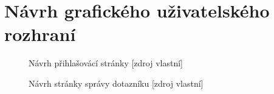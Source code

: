 

\chapter{Návrh grafického uživatelského rozhraní}

    \begin{figure}[!h]
    \begin{center}
    \caption{Návrh přihlašovácí stránky [zdroj vlastní]}
    \label{guiProjekt}
    \end{center}
    \end{figure}
    
    \begin{figure}[!h]
    \begin{center}
    \caption{Návrh stránky správy dotazníku [zdroj vlastní]}
    \label{guiProjekt}
    \end{center}
    \end{figure}

